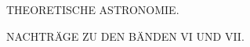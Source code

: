 \clearpage\begingroup\NoSourceHead{}
\vspace*{.22\textheight}
\begin{center}
{\Large THEORETISCHE ASTRONOMIE.}\par\vspace{1.6em}
NACHTRÄGE ZU DEN BÄNDEN VI UND VII.
\end{center}
\fancyfoot[R]{\small 28\textsuperscript{*}}
\clearpage\endgroup
